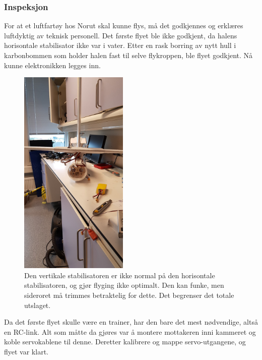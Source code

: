 \documentclass[12pt, a4paper]{article}
\begin{document}
\subsubsection{Inspeksjon}
For at et luftfartøy hos Norut skal kunne flys, må det godkjennes og erklæres luftdyktig av teknisk personell. Det første flyet ble ikke godkjent, da halens horisontale stabilisator ikke var i vater. Etter en rask borring av nytt hull i karbonbommen som holder halen fast til selve flykroppen, ble flyet godkjent. Nå kunne elektronikken legges inn. \\

\begin{figure}[ht]
	\centering

	\includegraphics[width = .5\textwidth, height = 10cm]{bilder/skjev_halefinne.jpg}
	\caption[Skjev stabilisator]{Den vertikale stabilisatoren er ikke normal på den horisontale stabilisatoren, og gjør flyging ikke optimalt. Den kan funke, men sideroret må trimmes betraktelig for dette. Det begrenser det totale utslaget.}
	
\end{figure}

Da det første flyet skulle være en trainer, har den bare det mest nødvendige, altså en RC-link. Alt som måtte da gjøres var å montere mottakeren inni kammeret og koble servokablene til denne. Deretter kalibrere og mappe servo-utgangene, og flyet var klart.
\end{document}
